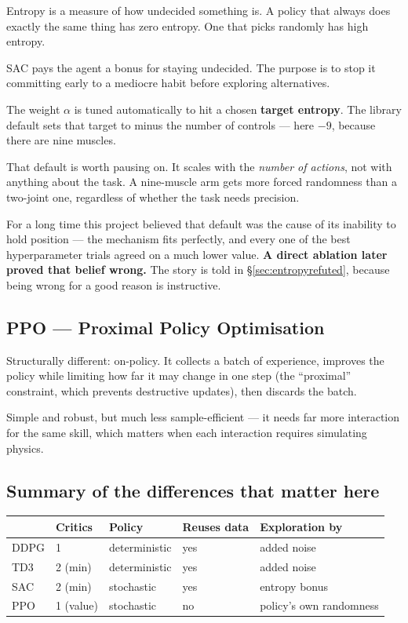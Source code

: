 \begin{plain}
Entropy is a measure of how undecided something is. A policy that always does
exactly the same thing has zero entropy. One that picks randomly has high
entropy.

SAC pays the agent a bonus for staying undecided. The purpose is to stop it
committing early to a mediocre habit before exploring alternatives.

The weight $\alpha$ is tuned automatically to hit a chosen \textbf{target
entropy}. The library default sets that target to minus the number of controls
--- here $-9$, because there are nine muscles.
\end{plain}

\begin{why}
That default is worth pausing on. It scales with the \emph{number of actions},
not with anything about the task. A nine-muscle arm gets more forced randomness
than a two-joint one, regardless of whether the task needs precision.

For a long time this project believed that default was the cause of its
inability to hold position --- the mechanism fits perfectly, and every one of the
best hyperparameter trials agreed on a much lower value. \textbf{A direct
ablation later proved that belief wrong.} The story is told in
\S\ref{sec:entropyrefuted}, because being wrong for a good reason is instructive.
\end{why}

\subsection{PPO --- Proximal Policy Optimisation}

Structurally different: on-policy. It collects a batch of experience, improves
the policy while limiting how far it may change in one step (the ``proximal''
constraint, which prevents destructive updates), then discards the batch.

Simple and robust, but much less sample-efficient --- it needs far more
interaction for the same skill, which matters when each interaction requires
simulating physics.

\subsection{Summary of the differences that matter here}

\begin{center}
\begin{tabular}{@{} L{2.2cm} C{2.0cm} C{2.2cm} C{2.6cm} L{4.6cm} @{}}
\toprule
& \textbf{Critics} & \textbf{Policy} & \textbf{Reuses data} & \textbf{Exploration by} \\
\midrule
DDPG & 1 & deterministic & yes & added noise \\
TD3  & 2 (min) & deterministic & yes & added noise \\
SAC  & 2 (min) & stochastic & yes & entropy bonus \\
PPO  & 1 (value) & stochastic & no & policy's own randomness \\
\bottomrule
\end{tabular}
\end{center}

